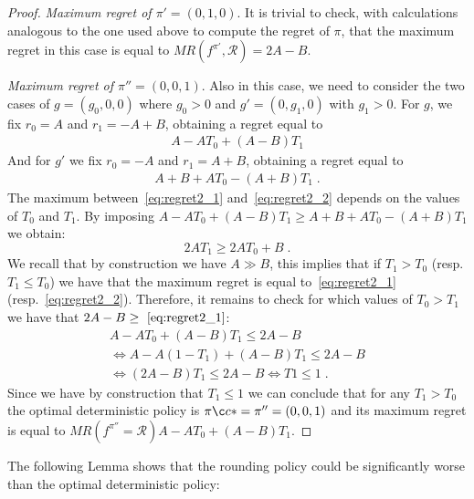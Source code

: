 \begin{proof}
\textit{Maximum regret of $\pi' = (0, 1, 0)$}.
It is trivial to check, with calculations analogous to the one used above to compute the regret of $\pi$, that the maximum regret in this case is equal to $MR(f^{\pi'}, \mathcal{R}) = 2A-B$.


\textit{Maximum regret of $\pi'' = (0, 0, 1)$}.
Also in this case, we need to consider the two cases of $g =(g_0, 0 ,0)$ where $g_0 > 0$ and $g' = (0, g_1, 0)$ with $g_1 > 0$. For $g$, we fix $r_0 = A$ and $r_1 = -A+B$, obtaining a regret equal to 
\begin{align}
A- A T_0 +(A-B) T_1 \label{eq:regret2_1}
\end{align}
And for $g'$ we fix $r_0 = -A$ and $r_1 = A+B$, obtaining a regret equal to 
\begin{align}
A+B+A T_0 -(A+B) T_1\;. \label{eq:regret2_2}
\end{align}
The maximum between~\eqref{eq:regret2_1} and~\eqref{eq:regret2_2} depends on the values of $T_0$ and $T_1$.
By imposing  $A- A T_0 +(A-B) T_1 \geq A+B+A T_0 -(A+B) T_1$ we obtain:
$$ 2A T_1 \geq 2 A T_0 + B\;. $$
We recall that by construction we have $A \gg B$, this implies that if $T_1> T_0$ (resp. $T_1\leq T_0$)  we have that the maximum regret is equal to~\eqref{eq:regret2_1} (resp.~\eqref{eq:regret2_2}).
Therefore, it remains to check for which values of $T_0 > T_1$ we have that $2A-B \geq~\eqref{eq:regret2_1}$:
\begin{align*}
A- A T_0 +(A-B) T_1 \leq 2A - B \\
 \Leftrightarrow A- A (1-T_1) +(A-B) T_1 \leq 2A - B\\
  \Leftrightarrow (2A-B)T_1 \leq 2A-B  \Leftrightarrow T1 \leq 1\;.
\end{align*}
 Since we have by construction that $T_1 \leq1$ we can conclude that for any $T_1> T_0$ the optimal deterministic policy is $\piç* = \pi''= (0, 0,1)$ and its maximum regret is equal to $MR(f^{\pi''} =  \mathcal{R})A- A T_0 +(A-B) T_1$. 
\end{proof}



The following Lemma shows that the rounding policy could be significantly worse than the optimal deterministic policy:

